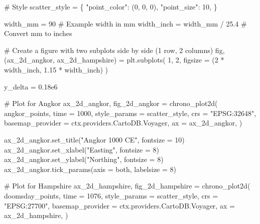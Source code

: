 \documentclass[
  11pt,
  letterpaper,
  DIV=11,
  numbers=noendperiod]{scrartcl}
\newenvironment{Shaded}{\begin{snugshade}}{\end{snugshade}}
\newcommand{\CommentTok}[1]{\textcolor[rgb]{0.37,0.37,0.37}{#1}}
\newcommand{\DecValTok}[1]{\textcolor[rgb]{0.68,0.00,0.00}{#1}}
\newcommand{\FloatTok}[1]{\textcolor[rgb]{0.68,0.00,0.00}{#1}}
\newcommand{\NormalTok}[1]{\textcolor[rgb]{0.00,0.23,0.31}{#1}}
\newcommand{\OperatorTok}[1]{\textcolor[rgb]{0.37,0.37,0.37}{#1}}
\newcommand{\StringTok}[1]{\textcolor[rgb]{0.13,0.47,0.30}{#1}}
\begin{document}
\begin{Shaded}
\begin{Highlighting}[]
\CommentTok{\# Style}
\NormalTok{scatter\_style }\OperatorTok{=}\NormalTok{ \{}
    \StringTok{"point\_color"}\NormalTok{: (}\DecValTok{0}\NormalTok{, }\DecValTok{0}\NormalTok{, }\DecValTok{0}\NormalTok{),}
    \StringTok{"point\_size"}\NormalTok{: }\DecValTok{10}\NormalTok{,}
\NormalTok{\}}

\NormalTok{width\_mm }\OperatorTok{=} \DecValTok{90}  \CommentTok{\# Example width in mm}
\NormalTok{width\_inch }\OperatorTok{=}\NormalTok{ width\_mm }\OperatorTok{/} \FloatTok{25.4}  \CommentTok{\# Convert mm to inches}

\CommentTok{\# Create a figure with two subplots side by side (1 row, 2 columns)}
\NormalTok{fig, (ax\_2d\_angkor, ax\_2d\_hampshire) }\OperatorTok{=}\NormalTok{ plt.subplots(}
    \DecValTok{1}\NormalTok{, }
    \DecValTok{2}\NormalTok{, }
\NormalTok{    figsize }\OperatorTok{=}\NormalTok{ (}\DecValTok{2} \OperatorTok{*}\NormalTok{ width\_inch, }\FloatTok{1.15} \OperatorTok{*}\NormalTok{ width\_inch)}
\NormalTok{)}

\NormalTok{y\_delta }\OperatorTok{=} \FloatTok{0.18e6}

\CommentTok{\# Plot for Angkor}
\NormalTok{ax\_2d\_angkor, fig\_2d\_angkor }\OperatorTok{=}\NormalTok{ chrono\_plot2d(}
\NormalTok{    angkor\_points,}
\NormalTok{    time }\OperatorTok{=} \DecValTok{1000}\NormalTok{,}
\NormalTok{    style\_params }\OperatorTok{=}\NormalTok{ scatter\_style,}
\NormalTok{    crs }\OperatorTok{=} \StringTok{"EPSG:32648"}\NormalTok{,}
\NormalTok{    basemap\_provider }\OperatorTok{=}\NormalTok{ ctx.providers.CartoDB.Voyager,}
\NormalTok{    ax }\OperatorTok{=}\NormalTok{ ax\_2d\_angkor,}
\NormalTok{)}

\NormalTok{ax\_2d\_angkor.set\_title(}\StringTok{"Angkor 1000 CE"}\NormalTok{, fontsize }\OperatorTok{=} \DecValTok{10}\NormalTok{)}
\NormalTok{ax\_2d\_angkor.set\_xlabel(}\StringTok{"Easting"}\NormalTok{, fontsize }\OperatorTok{=} \DecValTok{8}\NormalTok{)}
\NormalTok{ax\_2d\_angkor.set\_ylabel(}\StringTok{"Northing"}\NormalTok{, fontsize }\OperatorTok{=} \DecValTok{8}\NormalTok{)}
\NormalTok{ax\_2d\_angkor.tick\_params(axis }\OperatorTok{=} \StringTok{\textquotesingle{}both\textquotesingle{}}\NormalTok{, labelsize }\OperatorTok{=} \DecValTok{8}\NormalTok{)}

\CommentTok{\# Plot for Hampshire}
\NormalTok{ax\_2d\_hampshire, fig\_2d\_hampshire }\OperatorTok{=}\NormalTok{ chrono\_plot2d(}
\NormalTok{    doomsday\_points,}
\NormalTok{    time }\OperatorTok{=} \DecValTok{1076}\NormalTok{,}
\NormalTok{    style\_params }\OperatorTok{=}\NormalTok{ scatter\_style,}
\NormalTok{    crs }\OperatorTok{=} \StringTok{"EPSG:27700"}\NormalTok{,}
\NormalTok{    basemap\_provider }\OperatorTok{=}\NormalTok{ ctx.providers.CartoDB.Voyager,}
\NormalTok{    ax }\OperatorTok{=}\NormalTok{ ax\_2d\_hampshire,}
\NormalTok{)}


\end{Highlighting}
\end{Shaded}
\end{document}
